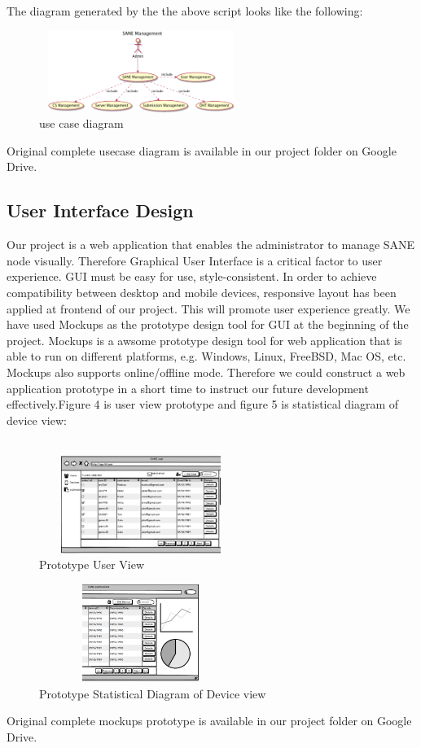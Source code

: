 \documentclass[12pt,oneside,a4paper]{article}
\begin{document}
\normalsize{The diagram generated by the the above script looks like the following:}\\
\begin{figure}[htb]
\centering
\includegraphics[width=250px, height=100px]{usecase.png}
\caption{use case diagram}
\label{picture-label3}
\end{figure}

Original complete usecase diagram is available in our project folder on Google Drive.

\subsection{\large User Interface Design}
Our project is a web application that enables the administrator to manage SANE node visually. Therefore Graphical User Interface is a critical factor to user experience. GUI must be easy for use, style-consistent. In order to achieve compatibility between desktop and mobile devices, responsive layout has been applied at frontend of our project. This will promote user experience greatly. We have used Mockups as the prototype design tool for GUI at the beginning of the project. Mockups is a awsome prototype design tool for web application that is able to run on different platforms, e.g. Windows, Linux, FreeBSD, Mac OS, etc. Mockups also supports online/offline mode. Therefore we could construct a web application prototype in a short time to instruct our future development effectively.Figure 4 is user view prototype and figure 5 is statistical diagram of device view:\\\\
\begin{figure}[htb]
\centering
\includegraphics[width=250px, height=120px]{gui.png}
\caption{Prototype User View}
\label{picture-label4}
\end{figure}
\begin{figure}[htb]
\centering
\includegraphics[width=250px, height=120px]{device.png}
\caption{Prototype Statistical Diagram of Device view}
\label{picture-label5}
\end{figure}
Original complete mockups prototype is available in our project folder on Google Drive.
\end{document}
